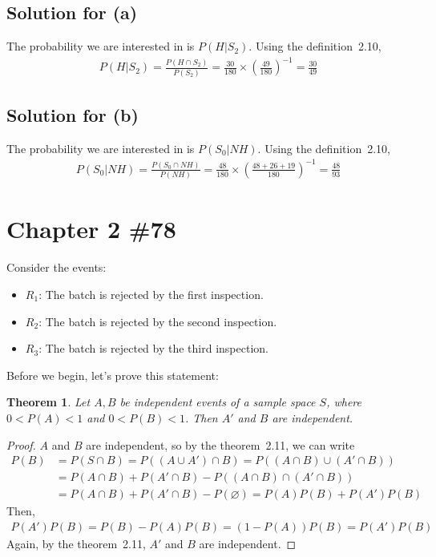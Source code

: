 \documentclass{scrartcl}
\newtheorem{theorem}{Theorem}
\begin{document}
\subsection{Solution for (a)}
The probability we are interested in is \(P(H | S_2)\). Using the
definition~2.10,
\begin{align*}
  P(H | S_2)
  = \frac{P(H \cap S_2)}{P(S_2)}
  = \frac{30}{180} \times \left( \frac{49}{180} \right)^{-1}
  = \frac{30}{49}
\end{align*}

\subsection{Solution for (b)}
The probability we are interested in is \(P(S_0 | NH)\). Using the
definition~2.10,
\begin{align*}
  P(S_0 | NH)
  = \frac{P(S_0 \cap NH)}{P(NH)}
  = \frac{48}{180} \times \left( \frac{48 + 26 + 19}{180} \right)^{-1}
  = \frac{48}{93}
\end{align*}

\section{Chapter 2 \#78}
Consider the events:
\begin{itemize}
  \item \(R_1\): The batch is rejected by the first inspection.
  \item \(R_2\): The batch is rejected by the second inspection.
  \item \(R_3\): The batch is rejected by the third inspection.
\end{itemize}

Before we begin, let's prove this statement:
\begin{theorem}
  Let \(A, B\) be independent events of a sample space \(S\), where
  \(0 < P(A) < 1\) and \(0 < P(B) < 1\). Then \(A'\) and \(B\) are independent.
\end{theorem}
\begin{proof}
  \(A\) and \(B\) are independent, so by the theorem~2.11, we can write
  \begin{align*}
    P(B)
    &= P(S \cap B)
    = P((A \cup A') \cap B)
    = P((A \cap B) \cup (A' \cap B)) \\
    &= P(A \cap B) + P(A' \cap B) - P((A \cap B) \cap (A' \cap B)) \\
    &= P(A \cap B) + P(A' \cap B) - P(\varnothing)
    = P(A)P(B) + P(A')P(B)
  \end{align*}
  Then,
  \begin{align*}
    P(A')P(B) = P(B) - P(A)P(B) = (1 - P(A))P(B) = P(A')P(B)
  \end{align*}
  Again, by the theorem~2.11, \(A'\) and \(B\) are independent.
\end{proof}
\end{document}
